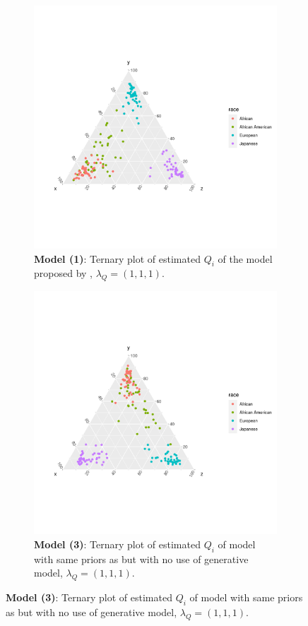 \documentclass{article}
\begin{document}
\begin{figure}[h]
  \begin{subfigure}[t]{.4\textwidth}
    \centering
    \includegraphics[width=\linewidth]{SemesterProject/haplo_tern_mod1.png}
    \caption{\textbf{Model (1)}: Ternary plot of estimated $Q_i$ of the model proposed by \citeauthor{efron2016CASI}, $\lambda_Q = (1, 1, 1)$.}
  \end{subfigure}
  \hfill
  \begin{subfigure}[t]{.4\textwidth}
    \centering
    \includegraphics[width=\linewidth]{SemesterProject/haplo_tern_mod3.png}
    \caption{\textbf{Model (3)}: Ternary plot of estimated $Q_i$ of model with same priors as \citeauthor{efron2016CASI} but with no use of generative model, $\lambda_Q = (1, 1, 1)$.}
  \end{subfigure}


\end{figure}
\end{document}
